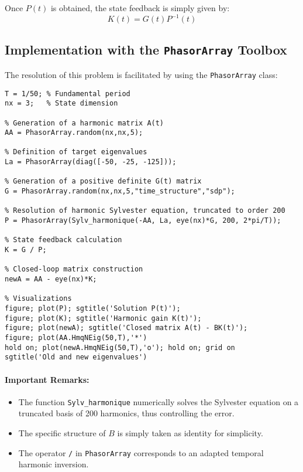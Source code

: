 \documentclass[11pt,a4paper]{article}
\begin{document}
Once $P(t)$ is obtained, the state feedback is simply given by:
\begin{equation}
K(t) = G(t) P^{-1}(t)
\end{equation}

\subsection{Implementation with the \texttt{PhasorArray} Toolbox}

The resolution of this problem is facilitated by using the \texttt{PhasorArray} class:

\begin{lstlisting}[style=matlabstyle]
T = 1/50; % Fundamental period
nx = 3;   % State dimension

% Generation of a harmonic matrix A(t)
AA = PhasorArray.random(nx,nx,5);

% Definition of target eigenvalues
La = PhasorArray(diag([-50, -25, -125]));

% Generation of a positive definite G(t) matrix
G = PhasorArray.random(nx,nx,5,"time_structure","sdp");

% Resolution of harmonic Sylvester equation, truncated to order 200
P = PhasorArray(Sylv_harmonique(-AA, La, eye(nx)*G, 200, 2*pi/T));

% State feedback calculation
K = G / P;

% Closed-loop matrix construction
newA = AA - eye(nx)*K;

% Visualizations
figure; plot(P); sgtitle('Solution P(t)');
figure; plot(K); sgtitle('Harmonic gain K(t)');
figure; plot(newA); sgtitle('Closed matrix A(t) - BK(t)');
figure; plot(AA.HmqNEig(50,T),'*')
hold on; plot(newA.HmqNEig(50,T),'o'); hold on; grid on
sgtitle('Old and new eigenvalues')
\end{lstlisting}

\paragraph{Important Remarks:}
\begin{itemize}
    \item The function \texttt{Sylv\_harmonique} numerically solves the Sylvester equation on a truncated basis of 200 harmonics, thus controlling the error.
    \item The specific structure of $B$ is simply taken as identity for simplicity.
    \item The operator \texttt{/} in \texttt{PhasorArray} corresponds to an adapted temporal harmonic inversion.
\end{itemize}
\end{document}
